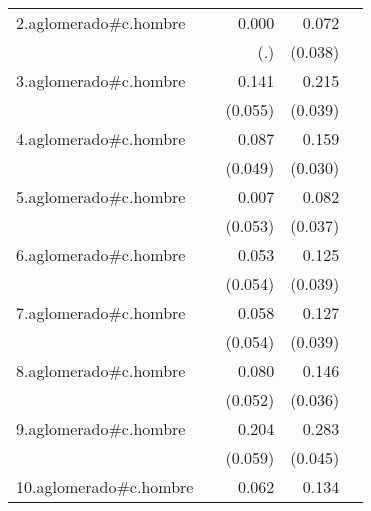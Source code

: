 {\begin{longtable}{l*{4}{D{.}{.}{-1}}}
\addlinespace
2.aglomerado#c.hombre&                     &       0.000         &       0.072         &                     \\
            &                     &         (.)         &     (0.038)         &                     \\
\addlinespace
3.aglomerado#c.hombre&                     &       0.141\sym{*}  &       0.215\sym{***}&                     \\
            &                     &     (0.055)         &     (0.039)         &                     \\
\addlinespace
4.aglomerado#c.hombre&                     &       0.087         &       0.159\sym{***}&                     \\
            &                     &     (0.049)         &     (0.030)         &                     \\
\addlinespace
5.aglomerado#c.hombre&                     &       0.007         &       0.082\sym{*}  &                     \\
            &                     &     (0.053)         &     (0.037)         &                     \\
\addlinespace
6.aglomerado#c.hombre&                     &       0.053         &       0.125\sym{**} &                     \\
            &                     &     (0.054)         &     (0.039)         &                     \\
\addlinespace
7.aglomerado#c.hombre&                     &       0.058         &       0.127\sym{**} &                     \\
            &                     &     (0.054)         &     (0.039)         &                     \\
\addlinespace
8.aglomerado#c.hombre&                     &       0.080         &       0.146\sym{***}&                     \\
            &                     &     (0.052)         &     (0.036)         &                     \\
\addlinespace
9.aglomerado#c.hombre&                     &       0.204\sym{***}&       0.283\sym{***}&                     \\
            &                     &     (0.059)         &     (0.045)         &                     \\
\addlinespace
10.aglomerado#c.hombre&                     &       0.062         &       0.134\sym{***}&                     \\

\end{longtable}}
